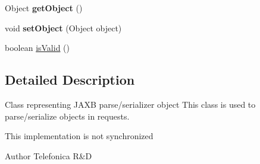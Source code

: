 \begin{DoxyCompactItemize}
\item 
\hypertarget{classcom_1_1bluevia_1_1commons_1_1data_1_1JaxbEntity_abf69aa0684ebb4b430947bad7c6ee571}{
Object {\bfseries getObject} ()}
\label{classcom_1_1bluevia_1_1commons_1_1data_1_1JaxbEntity_abf69aa0684ebb4b430947bad7c6ee571}

\item 
\hypertarget{classcom_1_1bluevia_1_1commons_1_1data_1_1JaxbEntity_a3e534ec758087f4d76a6f4553475ca6d}{
void {\bfseries setObject} (Object object)}
\label{classcom_1_1bluevia_1_1commons_1_1data_1_1JaxbEntity_a3e534ec758087f4d76a6f4553475ca6d}

\item 
boolean \hyperlink{classcom_1_1bluevia_1_1commons_1_1data_1_1JaxbEntity_a436671be1e1f5f5a4ee3e0ea3cb44ded}{isValid} ()
\end{DoxyCompactItemize}


\subsection{Detailed Description}
Class representing JAXB parse/serializer object This class is used to parse/serialize objects in requests.

This implementation is not synchronized

\begin{DoxyAuthor}{Author}
Telefonica R\&D 
\end{DoxyAuthor}


